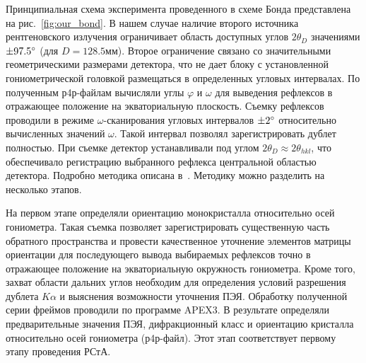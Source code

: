 Принципиальная схема эксперимента проведенного в схеме Бонда представлена на рис.~\ref{fig:our_bond}.
В нашем случае наличие второго источника рентгеновского излучения ограничивает область доступных углов $2\theta_D$ значениями $\pm 97.5^\circ$ (для $D = 128.5\unit{мм}$).
Второе ограничение связано со значительными геометрическими размерами детектора, что не дает блоку с установленной гониометрической головкой размещаться в определенных угловых интервалах.
По полученным р4р-файлам вычисляли углы $\varphi$ и $\omega$ для выведения рефлексов в отражающее положение на экваториальную плоскость.
Съемку рефлексов проводили в режиме $\omega$-сканирования угловых интервалов $\pm 2^\circ$ относительно вычисленных значений $\omega$.
Такой интервал позволял зарегистрировать дублет полностью.
При съемке детектор устанавливали под углом $2\theta_D \approx 2\theta_{hkl}$, что обеспечивало регистрацию выбранного рефлекса центральной областью детектора.
Подробно методика описана в~\cite{Kudryavtsev:2024:YEu,Kudryavtsev:2024:eccentr}.
Методику можно разделить на несколько этапов.

На первом этапе определяли ориентацию монокристалла относительно осей гониометра.
Такая съемка позволяет зарегистрировать существенную часть обратного пространства и провести качественное уточнение элементов матрицы ориентации для последующего вывода выбираемых рефлексов точно в отражающее положение на экваториальную окружность гониометра.
Кроме того, захват области дальних углов необходим для определения условий разрешения дублета $K\alpha$ и выяснения возможности уточнения ПЭЯ.
Обработку полученной серии фреймов проводили по программе APEX3.
В результате определяли предварительные значения ПЭЯ, дифракционный класс и ориентацию кристалла относительно осей гониометра (р4р-файл).
Этот этап соответствует первому этапу проведения РСтА.

